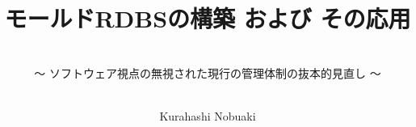 
\titlehead{\hfill\small\customdate}

\subject{\Large--- マシニングによるモールド加工 ---}

\title{\huge モールドRDBSの構築 および その応用}

\subtitle{\ \\\normalsize～ ソフトウェア視点の無視された現行の管理体制の抜本的見直し ～}

\date{}

\publishers{}

\author{\ \\\small Kurahashi Nobuaki}

\uppertitleback{\small
This document was created using \TeX{} (\linkLaTeX\kern.15em2$_{\textstyle\varepsilon}$), specifically utilizing tools such as \linkTeXLive{} 2023, up\LaTeX, \linkBibLaTeX\ (\linkBiber), \linkPGFTikZ, and many useful packages, and \linkTeXStudio.\\
Numerical calculations were performed using \linkExcel{} and \linkPython.\\
The source codes for the G-code programs were written using \linkVSCode.\\
Version control for these documents was managed using \linkGitHub.\\
The environment for these tools was managed using \linkDocker{} and \linkUbuntu.\\
The database used was \linkSQLite.\\
Thanks to these tools, with the all-around support of  (\linkBingChat), the creation of this document and system was made possible.
}

